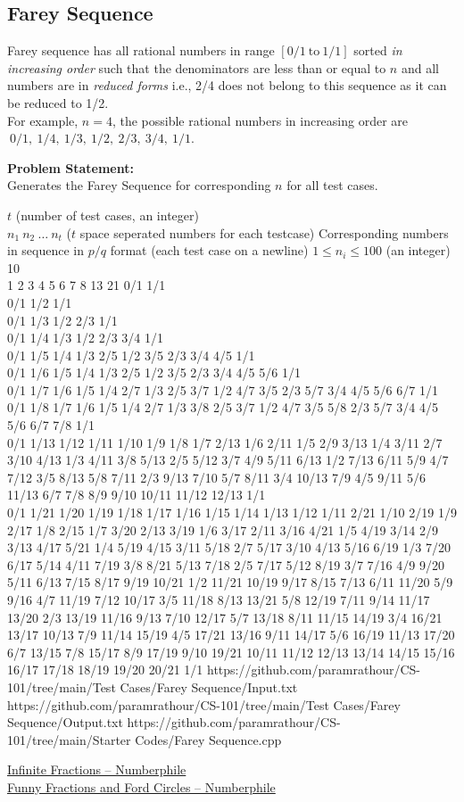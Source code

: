\subsection{Farey Sequence}
Farey sequence has all rational numbers in range $[0/1\ \text{to}\ 1/1]$ sorted \emph{in increasing order} such that the denominators are less than or equal to $n$ and all numbers are in \emph{reduced forms} i.e., 2/4 does not belong to this sequence as it can be reduced to 1/2.\\
For example, $n=4$, the possible rational numbers in increasing order are $\ 0/1,\ 1/4,\ 1/3,\ 1/2,\ 2/3,\ 3/4,\ 1/1$.

\textbf{Problem Statement:}\\
Generates the Farey Sequence for corresponding $n$ for all test cases.
\begin{testcasesMore}
	{$t$ \hfill(number of test cases, an integer)\\
	$n_1\ n_2\ \ldots\ n_t$ \hfill($t$ space seperated numbers for each testcase)}
	{Corresponding numbers in sequence in $p/q$ format \hfil(each test case on a newline)}
	{$1\leq n_i\leq 100$ \hfill(an integer)}
	{10\\1 2 3 4 5 6 7 8 13 21}
	{0/1 1/1\\0/1 1/2 1/1\\0/1 1/3 1/2 2/3 1/1\\0/1 1/4 1/3 1/2 2/3 3/4 1/1\\0/1 1/5 1/4 1/3 2/5 1/2 3/5 2/3 3/4 4/5 1/1\\0/1 1/6 1/5 1/4 1/3 2/5 1/2 3/5 2/3 3/4 4/5 5/6 1/1\\0/1 1/7 1/6 1/5 1/4 2/7 1/3 2/5 3/7 1/2 4/7 3/5 2/3 5/7 3/4 4/5 5/6 6/7 1/1\\0/1 1/8 1/7 1/6 1/5 1/4 2/7 1/3 3/8 2/5 3/7 1/2 4/7 3/5 5/8 2/3 5/7 3/4 4/5 5/6 6/7 7/8 1/1\\0/1 1/13 1/12 1/11 1/10 1/9 1/8 1/7 2/13 1/6 2/11 1/5 2/9 3/13 1/4 3/11 2/7 3/10 4/13 1/3 4/11 3/8 5/13 2/5 5/12 3/7 4/9 5/11 6/13 1/2 7/13 6/11 5/9 4/7 7/12 3/5 8/13 5/8 7/11 2/3 9/13 7/10 5/7 8/11 3/4 10/13 7/9 4/5 9/11 5/6 11/13 6/7 7/8 8/9 9/10 10/11 11/12 12/13 1/1\\0/1 1/21 1/20 1/19 1/18 1/17 1/16 1/15 1/14 1/13 1/12 1/11 2/21 1/10 2/19 1/9 2/17 1/8 2/15 1/7 3/20 2/13 3/19 1/6 3/17 2/11 3/16 4/21 1/5 4/19 3/14 2/9 3/13 4/17 5/21 1/4 5/19 4/15 3/11 5/18 2/7 5/17 3/10 4/13 5/16 6/19 1/3 7/20 6/17 5/14 4/11 7/19 3/8 8/21 5/13 7/18 2/5 7/17 5/12 8/19 3/7 7/16 4/9 9/20 5/11 6/13 7/15 8/17 9/19 10/21 1/2 11/21 10/19 9/17 8/15 7/13 6/11 11/20 5/9 9/16 4/7 11/19 7/12 10/17 3/5 11/18 8/13 13/21 5/8 12/19 7/11 9/14 11/17 13/20 2/3 13/19 11/16 9/13 7/10 12/17 5/7 13/18 8/11 11/15 14/19 3/4 16/21 13/17 10/13 7/9 11/14 15/19 4/5 17/21 13/16 9/11 14/17 5/6 16/19 11/13 17/20 6/7 13/15 7/8 15/17 8/9 17/19 9/10 19/21 10/11 11/12 12/13 13/14 14/15 15/16 16/17 17/18 18/19 19/20 20/21 1/1}
	{https://github.com/paramrathour/CS-101/tree/main/Test Cases/Farey Sequence/Input.txt}
	{https://github.com/paramrathour/CS-101/tree/main/Test Cases/Farey Sequence/Output.txt}
	{https://github.com/paramrathour/CS-101/tree/main/Starter Codes/Farey Sequence.cpp}
\end{testcasesMore}
\begin{funvideo}
\href{https://youtu.be/DpwUVExX27E}{Infinite Fractions -- Numberphile}\\
\href{https://youtu.be/0hlvhQZIOQw}{Funny Fractions and Ford Circles -- Numberphile}
\end{funvideo}
